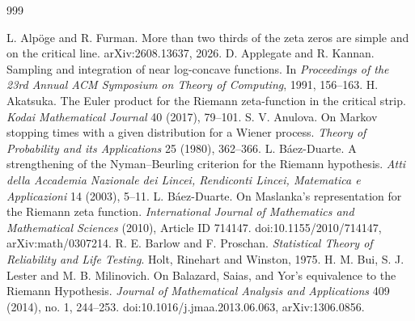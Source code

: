 \begin{thebibliography}{999}\small\setlength{\itemsep}{0pt}\setlength{\parsep}{0pt}\setlength{\parskip}{0pt}

 L. Alp\"oge and R. Furman. More than two thirds of the zeta zeros are simple and on the critical line. arXiv:2608.13637, 2026.
 D. Applegate and R. Kannan. Sampling and integration of near log-concave functions. In \emph{Proceedings of the 23rd Annual ACM Symposium on Theory of Computing}, 1991, 156--163.
 H. Akatsuka. The Euler product for the Riemann zeta-function in the critical strip. \emph{Kodai Mathematical Journal} 40 (2017), 79--101.
 S. V. Anulova. On Markov stopping times with a given distribution for a Wiener process. \emph{Theory of Probability and its Applications} 25 (1980), 362--366.
 L. B\'aez-Duarte. A strengthening of the Nyman--Beurling criterion for the Riemann hypothesis. \emph{Atti della Accademia Nazionale dei Lincei, Rendiconti Lincei, Matematica e Applicazioni} 14 (2003), 5--11.
 L. B\'aez-Duarte. On Maslanka's representation for the Riemann zeta function. \emph{International Journal of Mathematics and Mathematical Sciences} (2010), Article ID 714147. doi:10.1155/2010/714147, arXiv:math/0307214.
 R. E. Barlow and F. Proschan. \emph{Statistical Theory of Reliability and Life Testing}. Holt, Rinehart and Winston, 1975.
 H. M. Bui, S. J. Lester and M. B. Milinovich. On Balazard, Saias, and Yor's equivalence to the Riemann Hypothesis. \emph{Journal of Mathematical Analysis and Applications} 409 (2014), no. 1, 244--253. doi:10.1016/j.jmaa.2013.06.063, arXiv:1306.0856.

\end{thebibliography}

